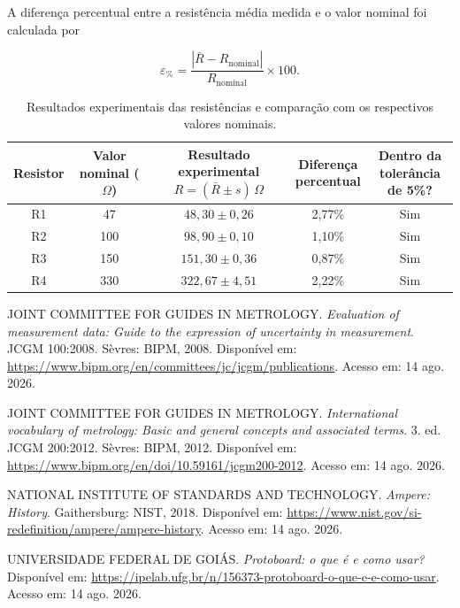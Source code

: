 \documentclass[a4paper,12pt]{article}
\begin{document}
A diferença percentual entre a resistência média medida e o valor
nominal foi calculada por

\[
    \varepsilon_{\%}
    =
    \frac{
        \left|\bar{R}-R_{\mathrm{nominal}}\right|
    }{
        R_{\mathrm{nominal}}
    }
    \times 100.
\]

\begin{table}[H]
    \centering
    \caption{Resultados experimentais das resistências e comparação
    com os respectivos valores nominais.}
    \label{tab:resultados_resistencias}
    \medskip

    \begin{tabular}{ccccc}
        \toprule
        \textbf{Resistor}
        & \shortstack{\textbf{Valor nominal}\\($\Omega$)}
        & \shortstack{\textbf{Resultado experimental}\\
          \(R=(\bar{R}\pm s)\,\Omega\)}
        & \shortstack{\textbf{Diferença}\\percentual}
        & \shortstack{\textbf{Dentro da}\\tolerância de 5\%?}
        \\
        \midrule
        R1 & 47  & \(48{,}30\pm0{,}26\)  & 2,77\% & Sim \\
        R2 & 100 & \(98{,}90\pm0{,}10\)  & 1,10\% & Sim \\
        R3 & 150 & \(151{,}30\pm0{,}36\) & 0,87\% & Sim \\
        R4 & 330 & \(322{,}67\pm4{,}51\) & 2,22\% & Sim \\
        \bottomrule
    \end{tabular}
\end{table}

\newpage
\begin{thebibliography}{99}

JOINT COMMITTEE FOR GUIDES IN METROLOGY.
\textit{Evaluation of measurement data: Guide to the expression of uncertainty
in measurement}. JCGM 100:2008. Sèvres: BIPM, 2008.
Disponível em: \url{https://www.bipm.org/en/committees/jc/jcgm/publications}.
Acesso em: 14 ago. 2026.

JOINT COMMITTEE FOR GUIDES IN METROLOGY.
\textit{International vocabulary of metrology: Basic and general concepts and
associated terms}. 3. ed. JCGM 200:2012. Sèvres: BIPM, 2012.
Disponível em: \url{https://www.bipm.org/en/doi/10.59161/jcgm200-2012}.
Acesso em: 14 ago. 2026.

NATIONAL INSTITUTE OF STANDARDS AND TECHNOLOGY.
\textit{Ampere: History}. Gaithersburg: NIST, 2018.
Disponível em: \url{https://www.nist.gov/si-redefinition/ampere/ampere-history}.
Acesso em: 14 ago. 2026.

UNIVERSIDADE FEDERAL DE GOIÁS.
\textit{Protoboard: o que é e como usar?}
Disponível em: \url{https://ipelab.ufg.br/n/156373-protoboard-o-que-e-e-como-usar}.
Acesso em: 14 ago. 2026.

\end{thebibliography}
\end{document}
